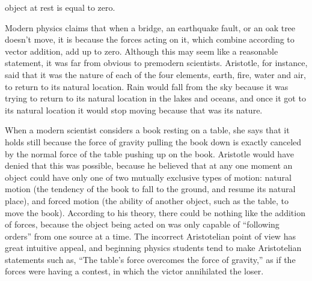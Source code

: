 
\label{lab:force_vector_digital}

\apparatus
{}

object at rest is equal to zero.

\introduction

Modern physics claims that when a bridge, an earthquake
fault, or an oak tree doesn't move, it is because the forces
acting on it, which combine according to vector addition,
add up to zero.  Although this may seem like a reasonable
statement, it was far from obvious to premodern scientists. 
Aristotle, for instance, said that it was the nature of each
of the four elements, earth, fire, water and air, to return
to its natural location.  Rain would fall from the sky
because it was trying to return to its natural location in
the lakes and oceans, and once it got to its natural
location it would stop moving because that was its nature.

When a modern scientist considers a book resting on a table,
she says that it holds still because the force of gravity
pulling the book down is exactly canceled by the normal
force of the table pushing up on the book.  Aristotle would
have denied that this was possible, because he believed that
at any one moment an object could have only one of two
mutually exclusive types of motion: natural motion (the
tendency of the book to fall to the ground, and resume its
natural place), and forced motion (the ability of another
object, such as the table, to move the book).  According to
his theory, there could be nothing like the addition of
forces, because the object being acted on was only capable
of ``following orders''  from one source at a time.  The
incorrect Aristotelian point of view has great intuitive
appeal, and beginning physics students tend to make
Aristotelian statements such as, ``The table's force
overcomes the force of gravity,'' as if the forces were
having a contest, in which the victor annihilated the loser.


\observations

